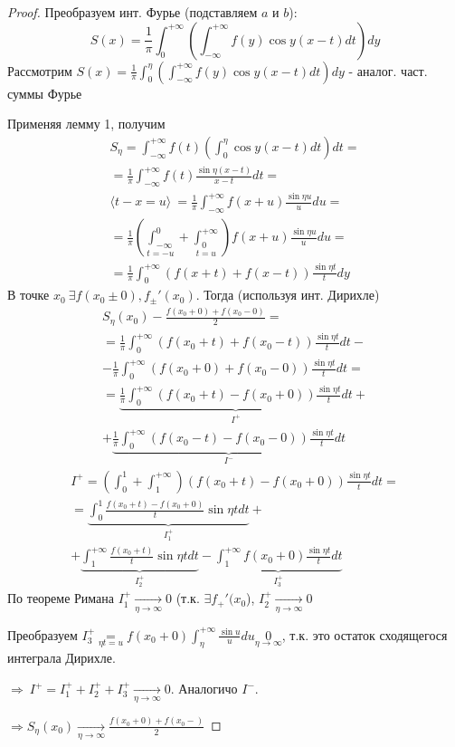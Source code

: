 \documentclass{article}
\theoremstyle{definition}
\numberwithin{theorem}{section}
\numberwithin{lemma}{section}
\numberwithin{definition}{section}
\numberwithin{corollary}{section}
\numberwithin{equation}{section}
\let\implies\Rightarrow
\begin{document}
\begin{proof}
  Преобразуем инт. Фурье (подставляем $a$ и $b$):
  \[
    S(x)=\frac{1}{\pi}\int_{0}^{+\infty}\left(\int_{-\infty}^{+\infty}f(y)\cos y (x-t)dt\right)dy
  \]
  Рассмотрим $S(x)=\frac{1}{\pi}\int_{0}^{\eta}\left(\int_{-\infty}^{+\infty}f(y)\cos y (x-t)dt\right)dy$ - аналог. част. суммы Фурье

  Применяя лемму 1, получим
  \begin{gather*}
    S_\eta=\int_{-\infty}^{+\infty}f(t)\left(\int_{0}^{\eta}\cos y(x-t)dt\right)dt  = \\
    = \frac{1}{\pi}\int_{-\infty}^{+\infty}f(t)\frac{\sin \eta(x-t)}{x-t}dt = \\ 
    \langle t-x=u \rangle \ =\frac{1}{\pi}\int_{-\infty}^{+\infty}f(x+u)\frac{\sin \eta u}{u}du= \\ 
    = \frac{1}{\pi}\left(\underset{t=-u}{\int_{-\infty}^{0}}+\underset{t=u}{\int_{0}^{+\infty}}\right)f(x+u)\frac{\sin \eta u}{u}du =  \\ 
    = \frac{1}{\pi}\int_{0}^{+\infty}(f(x+t)+f(x-t))\frac{\sin \eta t}{t}dy
  \end{gather*}
  В точке $x_0 \ \exists f(x_0\pm 0), f_{\pm}'(x_0)$. Тогда (используя инт. Дирихле)
  \begin{gather*}
    S_\eta(x_0)-\frac{f(x_0+0)+f(x_0-0)}{2}= \\ 
    = \frac{1}{\pi}\int_{0}^{+\infty}(f(x_0+t)+f(x_0-t))\frac{\sin \eta t}{t}dt - \\ -  \frac{1}{\pi}\int_{0}^{+\infty}(f(x_0+0)+f(x_0-0))\frac{\sin \eta t}{t}dt = \\ 
    = \underbrace{\frac{1}{\pi}\int_{0}^{+\infty}(f(x_0+t)-f(x_0+0))\frac{\sin \eta t}{t}dt}_{I^{+}} + \\ + \underbrace{\frac{1}{\pi}\int_{0}^{+\infty}(f(x_0-t)-f(x_0-0))\frac{\sin \eta t}{t}dt}_{I^{-}}
  \end{gather*}
  \begin{gather*}
    I^{+}=\left(\int_{0}^{1}+\int_{1}^{+\infty}\right)(f(x_0+t)-f(x_0+0))\frac{\sin\eta t}{t}dt = \\ 
    = \underbrace{\int_{0}^{1}\frac{f(x_0+t)-f(x_0+0)}{t}\sin \eta t dt}_{I^{+}_{1}} + \\ + \underbrace{\int_{1}^{+\infty}\frac{f(x_0+t)}{t}\sin \eta t dt}_{I_{2}^{+}} - \underbrace{\int_{1}^{+\infty}f(x_0+0)\frac{\sin \eta t}{t}dt}_{I_{3}^{+}}
  \end{gather*}
  По теореме Римана $I_{1}^{+} \underset{\eta \to \infty}{\to } 0$ (т.к. $\exists f_{+}'(x_0$), $I_{2}^{+} \underset{\eta \to \infty}{\to } 0$

  Преобразуем $I_{3}^{+}\underset{\eta t = u}{=}f(x_0+0)\int_{\eta}^{+\infty}\frac{\sin u}{u}du \underset{\eta\to \infty}{0}$,
  т.к. это остаток сходящегося интеграла Дирихле.

  $\implies \ I^{+}=I_{1}^{+}+ I_{2}^{+} + I_{3}^{+} \underset{\eta \to \infty}{\to} 0$. Аналогичо $I^{-}$.

  $\implies S_\eta(x_0) \underset{\eta \to \infty}{\to} \frac{f(x_0+0)+f(x_0-)}{2}$
\end{proof}
\end{document}
